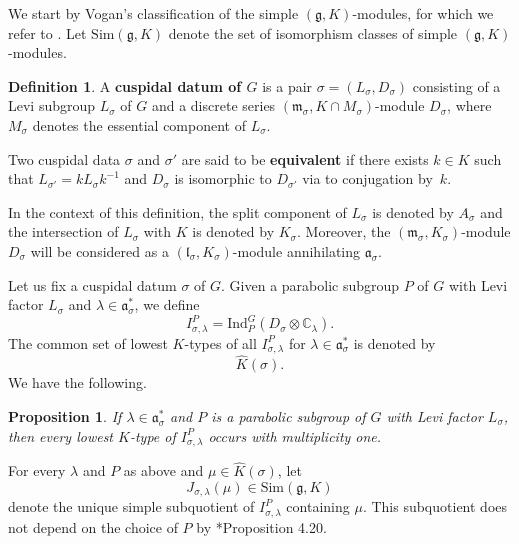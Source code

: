 \documentclass{amsart}
\newtheorem{proposition}[theorem]{Proposition}
\theoremstyle{definition}
\newtheorem{definition}[theorem]{Definition}
\begin{document}
We start by Vogan's classification of the simple $(\mathfrak{g},K)$-modules, for which we refer to . Let $\mathrm{Sim}(\mathfrak{g},K)$ denote the set of isomorphism classes of simple $(\mathfrak{g},K)$-modules.

\begin{definition}
    A \textbf{cuspidal datum of $G$} is a pair $\sigma = (L_\sigma, D_\sigma)$ consisting of a Levi subgroup $L_\sigma$ of $G$ and a discrete series $(\mathfrak{m}_\sigma, K\cap M_\sigma)$-module $D_\sigma$, where $M_\sigma$ denotes the essential component of $L_\sigma$.

    Two cuspidal data $\sigma$ and $\sigma'$ are said to be \textbf{equivalent} if there exists $k \in K$ such that $L_{\sigma'} = kL_\sigma k^{-1}$ and $D_{\sigma}$ is isomorphic to $D_{\sigma'}$ via to conjugation by~$k$.
\end{definition}

In the context of this definition, the split component of $L_\sigma$ is denoted by $A_\sigma$ and the intersection of $L_\sigma$ with $K$ is denoted by $K_\sigma$. Moreover, the $(\mathfrak{m}_\sigma,K_\sigma)$-module $D_\sigma$ will be considered as a $(\mathfrak{l}_\sigma,K_\sigma)$-module annihilating $\mathfrak{a}_\sigma$.


Let us fix a cuspidal datum $\sigma$ of $G$. Given a parabolic subgroup $P$ of $G$ with Levi factor $L_\sigma$ and $\lambda \in \mathfrak{a}_\sigma^*$, we define
\begin{equation}\label{definition_I^P} I_{\sigma,\lambda}^P = \mathrm{Ind}_P^G(D_{\sigma} \otimes \mathbb{C}_\lambda).\end{equation}
The common set of lowest $K$-types of all $I_{\sigma,\lambda}^P$ for $\lambda \in \mathfrak{a}_\sigma^*$ is denoted by
\begin{equation*}
    \widehat{K}(\sigma).
\end{equation*}
We have the following.

\begin{proposition}\label{multiplicityone}
    If $\lambda\in \mathfrak{a}_\sigma^*$ and $P$ is a parabolic subgroup of $G$ with Levi factor $L_\sigma$, then every lowest $K$-type of $I_{\sigma,\lambda}^P$ occurs with multiplicity one.
\end{proposition}

For every $\lambda$ and $P$ as above and $\mu \in \widehat{K}(\sigma)$, let
\begin{equation*}
    J_{\sigma,\lambda}(\mu) \in \mathrm{Sim}(\mathfrak{g},K)
\end{equation*} denote the unique simple subquotient of $I_{\sigma,\lambda}^P$ containing $\mu$. This subquotient does not depend on the choice of $P$ by \cite{VoganGreen}*{Proposition 4.20}.
\end{document}
